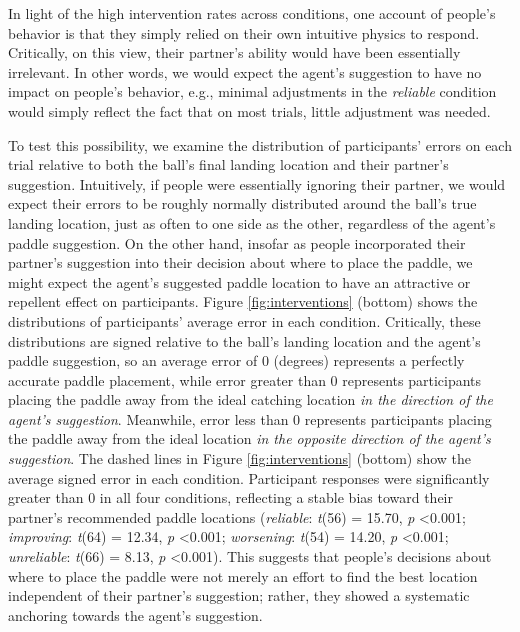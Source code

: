 \documentclass[10pt,letterpaper]{article}
\begin{document}
In light of the high intervention rates across conditions, one account of people's behavior is that they simply relied on their own intuitive physics to respond. Critically, on this view, their partner's ability would have been essentially irrelevant. In other words, we would expect the agent's suggestion to have no impact on people's behavior, e.g., minimal adjustments in the \textit{reliable} condition would simply reflect the fact that on most trials, little adjustment was needed. 

To test this possibility, we examine the distribution of participants' errors on each trial relative to both the ball's final landing location and their partner's suggestion. Intuitively, if people were essentially ignoring their partner, we would expect their errors to be roughly normally distributed around the ball's true landing location, just as often to one side as the other, regardless of the agent's paddle suggestion. On the other hand, insofar as people incorporated their partner's suggestion into their decision about where to place the paddle, we might expect the agent's suggested paddle location to have an attractive or repellent effect on participants. Figure \ref{fig:interventions} (bottom) shows the distributions of participants' average error in each condition. Critically, these distributions are signed relative to the ball's landing location and the agent's paddle suggestion, so an average error of 0 (degrees) represents a perfectly accurate paddle placement, while error greater than 0 represents participants placing the paddle away from the ideal catching location \textit{in the direction of the agent's suggestion}. Meanwhile, error less than 0 represents participants placing the paddle away from the ideal location \textit{in the opposite direction of the agent's suggestion}. The dashed lines in Figure \ref{fig:interventions} (bottom) show the average signed error in each condition. Participant responses were significantly greater than 0 in all four conditions, reflecting a stable bias toward their partner's recommended paddle locations (\textit{reliable}: \textit{t}(56) = 15.70, \textit{p} \textless{0.001}; \textit{improving}: \textit{t}(64) = 12.34, \textit{p} \textless{0.001}; \textit{worsening}: \textit{t}(54) = 14.20, \textit{p} \textless{0.001}; \textit{unreliable}: \textit{t}(66) = 8.13, \textit{p} \textless{0.001}). This suggests that people's decisions about where to place the paddle were not merely an effort to find the best location independent of their partner's suggestion; rather, they showed a systematic anchoring towards the agent's suggestion.
\end{document}
